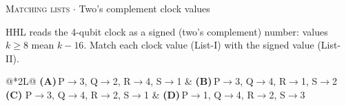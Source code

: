 \documentclass[11pt,a4paper]{article}
\newcommand{\optlabel}[1]{\textbf{(#1)}}
\newcommand{\correctlabel}[1]{\textcolor{okgreen}{\textbf{(#1)}\,\ding{51}}}
\newenvironment{qitem}[1]{\begin{list}{}{\setlength{\leftmargin}{3.3em}\setlength{\labelwidth}{3.1em}%
  \setlength{\labelsep}{0.2em}\setlength{\topsep}{3pt}\setlength{\parsep}{3pt}}\item[\textbf{Q.#1}\hfill]}{\end{list}}
\newcommand{\qmeta}[2]{{\footnotesize\color{black!60}\textsc{#1} \;$\cdot$\; #2}\par}
\begin{document}
\begin{qitem}{30}
\qmeta{Matching lists}{Two's complement clock values}
HHL reads the 4-qubit clock as a signed (two's complement) number: values $k \ge 8$ mean $k - 16$. Match each clock value (List-I) with the signed value
(List-II).
\par\smallskip{}
\par\smallskip\noindent\begin{tabularx}{\linewidth}{@{}*{2}{L}@{}}
\optlabel{A}\,P$\to$3, Q$\to$2, R$\to$4, S$\to$1 & \optlabel{B}\,P$\to$3, Q$\to$4, R$\to$1, S$\to$2 \\[3pt]
\correctlabel{C}\,P$\to$3, Q$\to$4, R$\to$2, S$\to$1 & \optlabel{D}\,P$\to$1, Q$\to$4, R$\to$2, S$\to$3
\end{tabularx}
\end{qitem}
\end{document}
